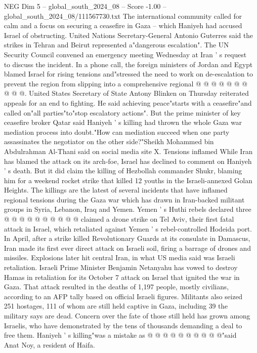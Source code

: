 \begin{textsample}{NEG Dim 5 – global\_south\_2024\_08 – Score -1.00 – global\_south\_2024\_08/111567730.txt}
The international community called for calm and a focus on securing a ceasefire in Gaza -- which Haniyeh had accused Israel of obstructing.
United Nations Secretary-General Antonio Guterres said the strikes in Tehran and Beirut represented a"dangerous escalation".
The UN Security Council convened an emergency meeting Wednesday at Iran ' s request to discuss the incident.
In a phone call, the foreign ministers of Jordan and Egypt blamed Israel for rising tensions and"stressed the need to work on de-escalation to prevent the region from slipping into a comprehensive regional @ @ @ @ @ @ @ @ @ @.
United States Secretary of State Antony Blinken on Thursday reiterated appeals for an end to fighting.
He said achieving peace"starts with a ceasefire"and called on"all parties"to"stop escalatory actions".
But the prime minister of key ceasefire broker Qatar said Haniyeh ' s killing had thrown the whole Gaza war mediation process into doubt."How can mediation succeed when one party assassinates the negotiator on the other side?"Sheikh Mohammed bin Abdulrahman Al-Thani said on social media site X.
Tensions inflamed While Iran has blamed the attack on its arch-foe, Israel has declined to comment on Haniyeh ' s death.
But it did claim the killing of Hezbollah commander Shukr, blaming him for a weekend rocket strike that killed 12 youths in the Israeli-annexed Golan Heights.
The killings are the latest of several incidents that have inflamed regional tensions during the Gaza war which has drawn in Iran-backed militant groups in Syria, Lebanon, Iraq and Yemen.
Yemen ' s Huthi rebels declared three @ @ @ @ @ @ @ @ @ @ claimed a drone strike on Tel Aviv, their first fatal attack in Israel, which retaliated against Yemen ' s rebel-controlled Hodeida port.
In April, after a strike killed Revolutionary Guards at its consulate in Damascus, Iran made its first ever direct attack on Israeli soil, firing a barrage of drones and missiles.
Explosions later hit central Iran, in what US media said was Israeli retaliation.
Israeli Prime Minister Benjamin Netanyahu has vowed to destroy Hamas in retaliation for its October 7 attack on Israel that ignited the war in Gaza.
That attack resulted in the deaths of 1,197 people, mostly civilians, according to an AFP tally based on official Israeli figures.
Militants also seized 251 hostages, 111 of whom are still held captive in Gaza, including 39 the military says are dead.
Concern over the fate of those still held has grown among Israelis, who have demonstrated by the tens of thousands demanding a deal to free them.
Haniyeh ' s killing"was a mistake as @ @ @ @ @ @ @ @ @ @"said Anat Noy, a resident of Haifa.

\end{textsample}
